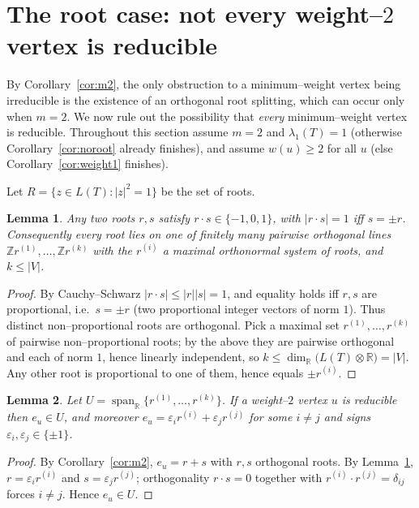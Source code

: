 \documentclass{article}
\newcommand{\bZ}{\mathbb{Z}}
\newtheorem{lemma}{Lemma}
\theoremstyle{definition}
\begin{document}
\section{The root case: not every weight--$2$ vertex is reducible}

By Corollary~\ref{cor:m2}, the only obstruction to a minimum--weight vertex being
irreducible is the existence of an orthogonal root splitting, which can occur
only when $m=2$.  We now rule out the possibility that \emph{every}
minimum--weight vertex is reducible.  Throughout this section assume
$m=2$ and $\lambda_1(T)=1$ (otherwise Corollary~\ref{cor:noroot} already
finishes), and assume $w(u)\geq 2$ for all $u$ (else
Corollary~\ref{cor:weight1} finishes).

Let $R=\{z\in L(T):|z|^2=1\}$ be the set of roots.

\begin{lemma}\label{lem:roots-ortho}
Any two roots $r,s$ satisfy $r\cdot s\in\{-1,0,1\}$, with $|r\cdot s|=1$ iff
$s=\pm r$.  Consequently every root lies on one of finitely many pairwise
orthogonal lines $\bZ r^{(1)},\dots,\bZ r^{(k)}$ with the $r^{(i)}$ a maximal
orthonormal system of roots, and $k\leq|V|$.
\end{lemma}

\begin{proof}
By Cauchy--Schwarz $|r\cdot s|\leq|r||s|=1$, and equality holds iff $r,s$ are
proportional, i.e.\ $s=\pm r$ (two proportional integer vectors of norm $1$).
Thus distinct non--proportional roots are orthogonal.  Pick a maximal set
$r^{(1)},\dots,r^{(k)}$ of pairwise non--proportional roots; by the above they
are pairwise orthogonal and each of norm $1$, hence linearly independent, so
$k\leq\dim_{\mathbb R}\bigl(L(T)\otimes\mathbb R\bigr)=|V|$.  Any other root is
proportional to one of them, hence equals $\pm r^{(i)}$.
\end{proof}

\begin{lemma}\label{lem:split-in-U}
Let $U=\operatorname{span}_{\mathbb R}\{r^{(1)},\dots,r^{(k)}\}$.  If a weight--$2$
vertex $u$ is reducible then $e_u\in U$, and moreover $e_u=\varepsilon_i
r^{(i)}+\varepsilon_j r^{(j)}$ for some $i\neq j$ and signs
$\varepsilon_i,\varepsilon_j\in\{\pm1\}$.
\end{lemma}

\begin{proof}
By Corollary~\ref{cor:m2}, $e_u=r+s$ with $r,s$ orthogonal roots.  By
Lemma~\ref{lem:roots-ortho}, $r=\varepsilon_i r^{(i)}$ and
$s=\varepsilon_j r^{(j)}$; orthogonality $r\cdot s=0$ together with
$r^{(i)}\cdot r^{(j)}=\delta_{ij}$ forces $i\neq j$.  Hence $e_u\in U$.
\end{proof}
\end{document}

